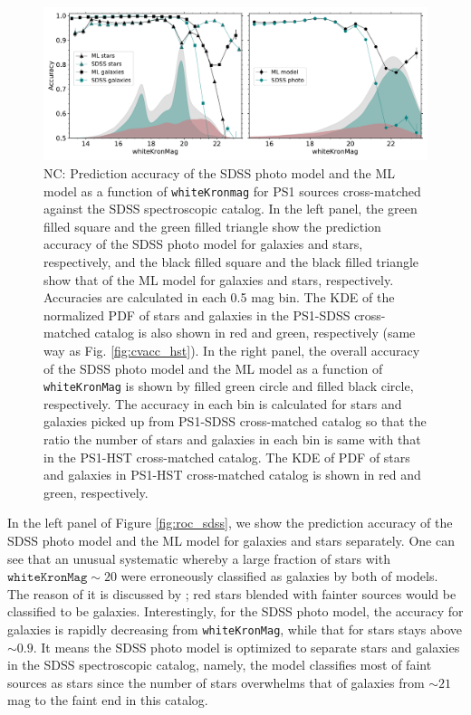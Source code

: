 \documentclass[twocolumn]{aastex62}
\newcommand{\NC}[1]{{\color{brown} NC: {#1}}}
\begin{document}
{%
\begin{figure}[t]
 \centering
  \includegraphics[width=6.7in, bb = 0 0 900 360]{./Figures/Accuracy_SDSS_ML_model.pdf}
  \caption{
  \NC{ 
  Prediction accuracy of the SDSS photo model and the ML model 
  as a function of \texttt{whiteKronmag} for PS1 sources cross-matched against the SDSS spectroscopic catalog. 
  In the left panel, the green filled square and the green filled triangle 
  show the prediction accuracy of the SDSS photo model for galaxies and stars, respectively, 
  and the black filled square and the black filled triangle show that of the ML model for galaxies and stars, respectively. 
  Accuracies are calculated in each 0.5 mag bin. 
  The KDE of the normalized PDF of stars and galaxies 
  in the PS1-SDSS cross-matched catalog is also shown in red and green, respectively (same way as Fig. \ref{fig:cvacc_hst}). 
  In the right panel, the overall accuracy of the SDSS photo model and the ML model 
  as a function of \texttt{whiteKronMag} is shown by filled green circle and filled black circle, respectively. 
  The accuracy in each bin is calculated for stars and galaxies picked up 
  from PS1-SDSS cross-matched catalog 
  so that the ratio the number of stars and galaxies in each bin is 
  same with that in the PS1-HST cross-matched catalog. 
  The KDE of PDF of stars and galaxies in PS1-HST cross-matched catalog is shown in red and green, respectively. 
  }
  } 
  \label{fig:acc_sdss}
\end{figure}
In the left panel of Figure \ref{fig:roc_sdss}, we show the prediction accuracy of the SDSS photo model 
and the ML model for galaxies and stars separately. 
One can see that an unusual systematic whereby a large fraction of stars with $\mathtt{whiteKronMag} \sim 20$ 
were erroneously classified as galaxies by both of models. 
The reason of it is discussed by \cite{Miller17}; 
red stars blended with fainter sources would be classified to be galaxies. 
Interestingly, for the SDSS photo model, the accuracy for galaxies is rapidly decreasing from \texttt{whiteKronMag}, 
while that for stars stays above $\sim 0.9$. 
It means the SDSS photo model is optimized to separate stars and galaxies in the SDSS spectroscopic catalog, 
namely, the model classifies most of faint sources as stars 
since the number of stars overwhelms that of galaxies from $\sim 21$ mag to the faint end in this catalog. 

}
\end{document}
